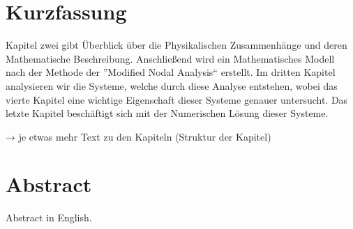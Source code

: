 
{%
	\chapter*{Kurzfassung}
	
	Kapitel zwei gibt Überblick über die Physikalischen Zusammenhänge und deren Mathematische Beschreibung. Anschließend wird ein Mathematisches Modell nach der Methode der ''Modified Nodal Analysis`` erstellt. Im dritten Kapitel analysieren wir die Systeme, welche durch diese Analyse entstehen, wobei das vierte Kapitel eine wichtige Eigenschaft dieser Systeme genauer untersucht. Das letzte Kapitel beschäftigt sich mit der Numerischen Lösung dieser Systeme.  
	
	→ je etwas mehr Text zu den Kapiteln (Struktur der Kapitel)
}

{%
	\chapter*{Abstract}
	
	Abstract in English.
}